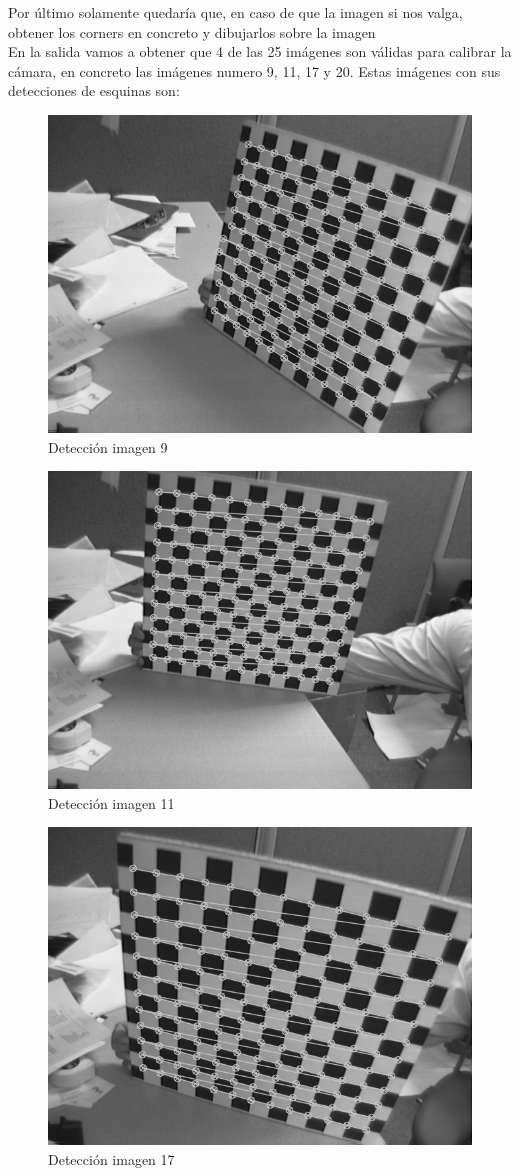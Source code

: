 Por último solamente quedaría que, en caso de que la imagen si nos valga, obtener los corners en concreto y dibujarlos sobre la imagen\\

En la salida vamos a obtener que 4 de las 25 imágenes son válidas para calibrar la cámara, en concreto las imágenes numero 9, 11, 17 y 20. Estas imágenes con sus detecciones de esquinas son:

\begin{figure}[H]
	\centering
	\includegraphics[width=0.7\linewidth]{ej2-1}
	\caption{Detección imagen 9}
\end{figure}

\begin{figure}[H]
	\centering
	\includegraphics[width=0.7\linewidth]{ej2-2}
	\caption{Detección imagen 11}
\end{figure}

\begin{figure}[H]
	\centering
	\includegraphics[width=0.7\linewidth]{ej2-3}
	\caption{Detección imagen 17}
\end{figure}

